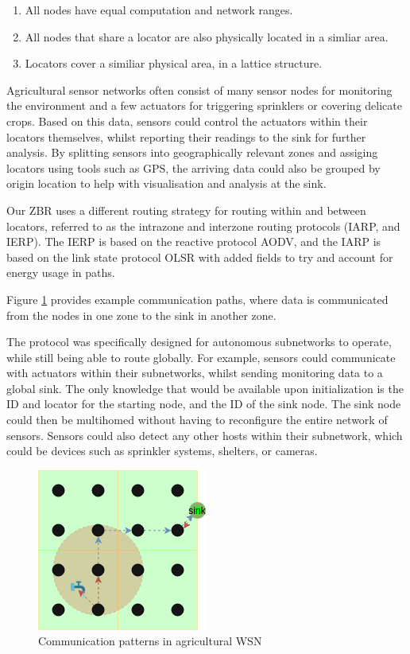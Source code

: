 \documentclass[12pt]{article}
\begin{document}
\begin{enumerate}
	\item All nodes have equal computation and network ranges.
	\item All nodes that share a locator are also physically located in a simliar area.
	\item Locators cover a similiar physical area, in a lattice structure.
\end{enumerate}

Agricultural sensor networks often consist of many sensor nodes for monitoring the environment and a few actuators for triggering sprinklers or covering delicate crops. Based on this data, sensors could control the actuators within their locators themselves, whilst reporting their readings to the sink for further analysis. By splitting sensors into geographically relevant zones and assiging locators using tools such as GPS, the arriving data could also be grouped by origin location to help with visualisation and analysis at the sink. 

Our ZBR uses a different routing strategy for routing within and between locators, referred to as the intrazone and interzone routing protocols (IARP, and IERP). The IERP is based on the reactive protocol AODV, and the IARP is based on the link state protocol OLSR with added fields to try and account for energy usage in paths. 

Figure \ref{fig:actuate} provides example communication paths, where data is communicated from the nodes in one zone to the sink in another zone.

The protocol was specifically designed for autonomous subnetworks to operate, while still being able to route globally. For example, sensors could communicate with actuators within their subnetworks, whilst sending monitoring data to a global sink. The only knowledge that would be available upon initialization is the ID and locator for the starting node, and the ID of the sink node. The sink node could then be multihomed without having to reconfigure the entire network of sensors. Sensors could also detect any other hosts within their subnetwork, which could be devices such as sprinkler systems, shelters, or cameras.

\begin{figure}[!ht]
	\centering
	\includegraphics[width=0.5\linewidth]{images/actuate}
	\caption{Communication patterns in agricultural WSN}
	\label{fig:actuate}
\end{figure}
\end{document}

